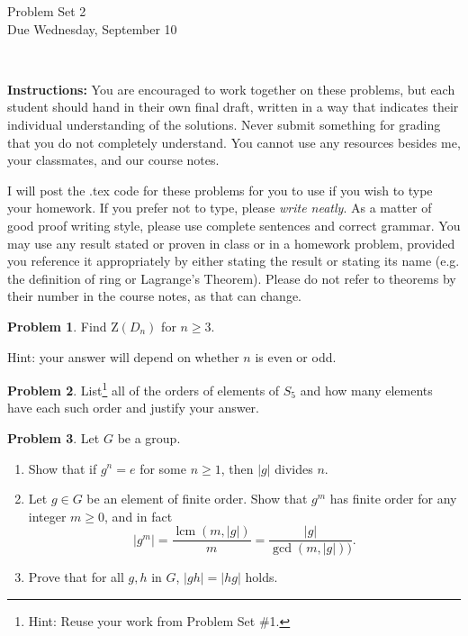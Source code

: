 \documentclass[11pt]{article}
\title{}
\date{\vspace{-0.5in}}
\DeclareMathOperator{\lcm}{lcm}
\theoremstyle{definition}
\newtheorem{problem}{Problem}
\begin{document}
\thispagestyle{fancy}
\pagestyle{fancy}

\vspace{3em}

\begin{center}
	{\LARGE Problem Set 2 \\}
	Due Wednesday, September 10
\end{center}

\

\noindent
{\bf Instructions:}
You are encouraged to work together on these problems, but each student should hand in their own final draft, written in a way that indicates their individual understanding of the solutions. Never submit something for grading that you do not completely understand. You cannot use any resources besides me, your classmates, and our course notes.


I will post the .tex code for these problems for you to use if you wish to type your homework. If you prefer not to type, please  {\em write neatly}. As a matter of good proof writing style, please use complete sentences and correct grammar. You may use any result stated or proven in class or in a homework problem, provided you reference it appropriately by either stating the result or stating its name (e.g. the definition of ring or Lagrange's Theorem). Please do not refer to theorems by their number in the course notes, as that can change.




\begin{problem}
Find $\mathrm{Z}(D_{n})$ for $n \geqslant 3$.  

\noindent Hint: your answer will depend on whether $n$ is even or odd.
\end{problem}


\begin{problem}
List\footnote{Hint: Reuse your work from Problem Set \#1.} all of the orders of elements of $S_5$ and how many elements have each such order and justify your answer.
\end{problem}



\begin{problem} Let $G$ be a group.
 \begin{enumerate}[(3.1)]
 \item Show that if $g^n=e$ for some $n \geq 1$, then $|g|$ divides $n$.
\item Let $g \in G$ be an element of finite order. Show that $g^m$ has finite order for any integer $m \geq 0$, and in fact
\[
|g^m| = \frac{\lcm(m,|g|)}{m} = \frac{|g|}{\gcd(m, |g|))}.
\]
\item Prove that for all $g, h$ in  $G$, $|gh| = |hg|$ holds.
\end{enumerate}
\end{problem}
\end{document}

